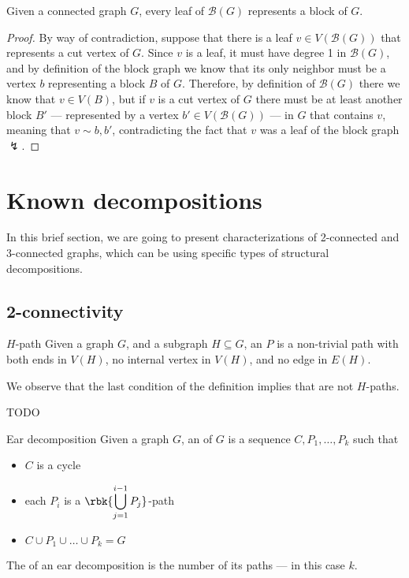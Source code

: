\documentclass[a4paper, 12pt]{report}
\begin{document}
    \begin{framedprop}{}
        Given a connected graph $G$, every leaf of $\mathcal B(G)$ represents a block of $G$.
    \end{framedprop}

    \begin{proof}
        By way of contradiction, suppose that there is a leaf $v \in V(\mathcal B(G))$ that represents a cut vertex of $G$. Since $v$ is a leaf, it must have degree 1 in $\mathcal B(G)$, and by definition of the block graph we know that its only neighbor must be a vertex $b$ representing a block $B$ of $G$. Therefore, by definition of $\mathcal B(G)$ there we know that $v \in V(B)$, but if $v$ is a cut vertex of $G$ there must be at least another block $B'$ --- represented by a vertex $b' \in V(\mathcal B(G))$ --- in $G$ that contains $v$, meaning that $v \sim b, b'$, contradicting the fact that $v$ was a leaf of the block graph $\lightning$.
    \end{proof}

    \section{Known decompositions}

    In this brief section, we are going to present characterizations of 2-connected and 3-connected graphs, which can be  using specific types of structural decompositions.

    \subsection{2-connectivity}

    \begin{frameddefn}{$H$-path}
        Given a graph $G$, and a subgraph $H \subseteq G$, an  $P$ is a non-trivial path with both ends in $V(H)$, no internal vertex in $V(H)$, and no edge in $E(H)$.
    \end{frameddefn}

    We observe that the last condition of the definition implies that  are not $H$-paths.

    TODO 

    \begin{frameddefn}{Ear decomposition}
        Given a graph $G$, an  of $G$ is a sequence $C, P_1, \ldots, P_k$ such that

        \begin{itemize}
            \item $C$ is a cycle
            \item each $P_i$ is a $\displaystyle \rbk{\bigcup_{j = 1}^{i - 1}{P_j}}$-path
            \item $C \cup P_1 \cup \ldots \cup P_k = G$
        \end{itemize}

        The  of an ear decomposition is the number of its paths --- in this case $k$.
    \end{frameddefn}
\end{document}
